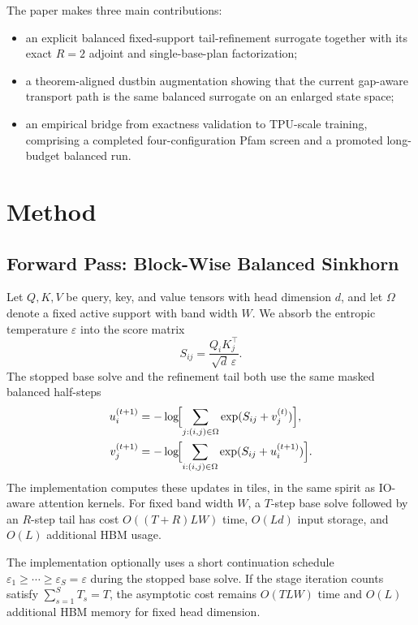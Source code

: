The paper makes three main contributions:
\begin{itemize}
    \item an explicit balanced fixed-support tail-refinement surrogate together with its exact $R=2$ adjoint and single-base-plan factorization;
    \item a theorem-aligned dustbin augmentation showing that the current gap-aware transport path is the same balanced surrogate on an enlarged state space;
    \item an empirical bridge from exactness validation to TPU-scale training, comprising a completed four-configuration Pfam screen and a promoted long-budget balanced run.
\end{itemize}

\section{Method}

\subsection{Forward Pass: Block-Wise Balanced Sinkhorn}

Let $Q,K,V$ be query, key, and value tensors with head dimension $d$, and let $\Omega$ denote a fixed active support with band width $W$. We absorb the entropic temperature $\varepsilon$ into the score matrix
\[
S_{ij} = \frac{Q_i K_j^\top}{\sqrt{d}\,\varepsilon}.
\]
The stopped base solve and the refinement tail both use the same masked balanced half-steps
\begin{align}
    u_i^{(t+1)} &= -\log\!\Bigl[\sum_{j:(i,j)\in\Omega} \exp(S_{ij} + v_j^{(t)})\Bigr], \\
    v_j^{(t+1)} &= -\log\!\Bigl[\sum_{i:(i,j)\in\Omega} \exp(S_{ij} + u_i^{(t+1)})\Bigr].
\end{align}
The implementation computes these updates in tiles, in the same spirit as IO-aware attention kernels. For fixed band width $W$, a $T$-step base solve followed by an $R$-step tail has cost $O((T+R)LW)$ time, $O(Ld)$ input storage, and $O(L)$ additional HBM usage.

\begin{remark}
The implementation optionally uses a short continuation schedule $\varepsilon_1 \ge \cdots \ge \varepsilon_S = \varepsilon$ during the stopped base solve. If the stage iteration counts satisfy $\sum_{s=1}^{S} T_s = T$, the asymptotic cost remains $O(TLW)$ time and $O(L)$ additional HBM memory for fixed head dimension.
\end{remark}

